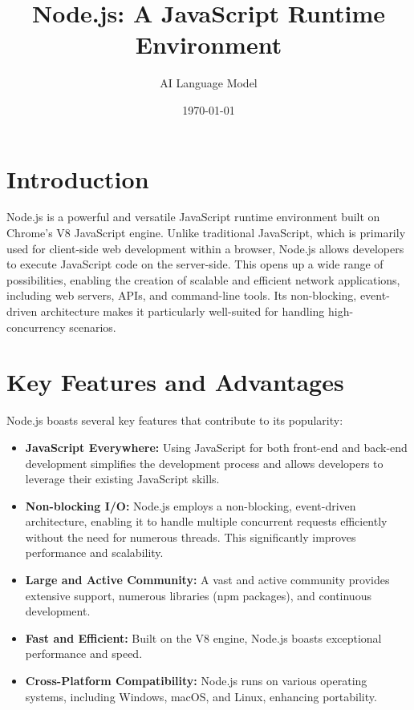 \documentclass{article}
\title{Node.js: A JavaScript Runtime Environment}
\author{AI Language Model}
\date{\today}
\begin{document}
\maketitle

\section{Introduction}

Node.js is a powerful and versatile JavaScript runtime environment built on Chrome's V8 JavaScript engine.  Unlike traditional JavaScript, which is primarily used for client-side web development within a browser, Node.js allows developers to execute JavaScript code on the server-side. This opens up a wide range of possibilities, enabling the creation of scalable and efficient network applications, including web servers, APIs, and command-line tools.  Its non-blocking, event-driven architecture makes it particularly well-suited for handling high-concurrency scenarios.

\section{Key Features and Advantages}

Node.js boasts several key features that contribute to its popularity:

\begin{itemize}
    \item \textbf{JavaScript Everywhere:}  Using JavaScript for both front-end and back-end development simplifies the development process and allows developers to leverage their existing JavaScript skills.
    \item \textbf{Non-blocking I/O:} Node.js employs a non-blocking, event-driven architecture, enabling it to handle multiple concurrent requests efficiently without the need for numerous threads. This significantly improves performance and scalability.
    \item \textbf{Large and Active Community:}  A vast and active community provides extensive support, numerous libraries (npm packages), and continuous development.
    \item \textbf{Fast and Efficient:} Built on the V8 engine, Node.js boasts exceptional performance and speed.
    \item \textbf{Cross-Platform Compatibility:}  Node.js runs on various operating systems, including Windows, macOS, and Linux, enhancing portability.
\end{itemize}
\end{document}
